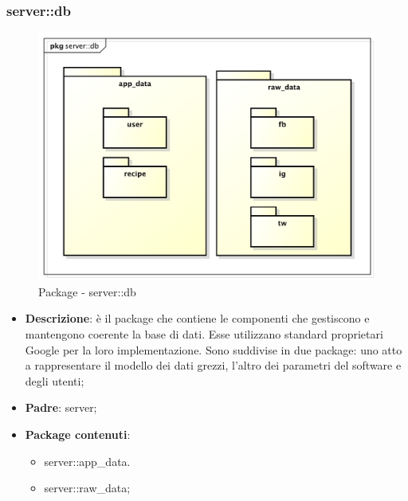 

\subsubsection{server::db} %
\label{ssub:bdsm_app_server_db}

	\begin{figure}[htbp]
		\centering
		\centerline{\includegraphics[scale=0.5]{./images/server/db.pdf}}
		\caption{Package - server::db}
	\end{figure}

	\begin{itemize}
		\item \textbf{Descrizione}: è il package che contiene le componenti che gestiscono e mantengono coerente la base di dati. Esse utilizzano standard proprietari Google per la loro implementazione. Sono suddivise in due package: uno atto a rappresentare il modello dei dati grezzi, l'altro dei parametri del software e degli utenti;
		\item \textbf{Padre}: server;
		\item \textbf{Package contenuti}:
			\begin{itemize}
				\item server::app\_data.
				\item server::raw\_data;
			\end{itemize}
	\end{itemize}




